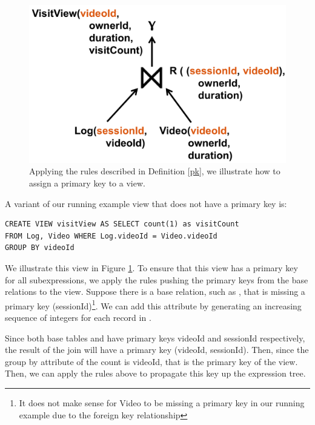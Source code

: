 \begin{figure}[t] \vspace{-2em}
\centering
 \includegraphics[scale=0.24]{figs/primary_key.png} \vspace{-.5em}
 \caption{Applying the rules described in Definition \ref{pk}, we illustrate how to assign a primary key to a view. \label{pk-fig}}\vspace{-1.5em}
\end{figure}

\begin{example}
A variant of our running example view that does not have a primary key is:
\begin{lstlisting}[mathescape,basicstyle={\scriptsize}]
CREATE VIEW visitView AS SELECT count(1) as visitCount
FROM Log, Video WHERE Log.videoId = Video.videoId
GROUP BY videoId
\end{lstlisting}
We illustrate this view in Figure \ref{pk-fig}.
To ensure that this view has a primary key for all subexpressions, we apply the rules pushing the primary keys from the base relations to the view.
Suppose there is a base relation, such as , that is missing a primary key (sessionId)\footnote{It does not make sense for Video to be missing a primary key in our running example due to the foreign key relationship}.
We can add this attribute by generating an increasing sequence of integers for each record in . 

Since both base tables  and  have primary keys videoId and sessionId respectively,
the result of the join will have a primary key (videoId, sessionId).
Then, since the group by attribute of the count is videoId, that is the primary key of the view.
Then, we can apply the rules above to propagate this key up the expression tree.
\end{example}

